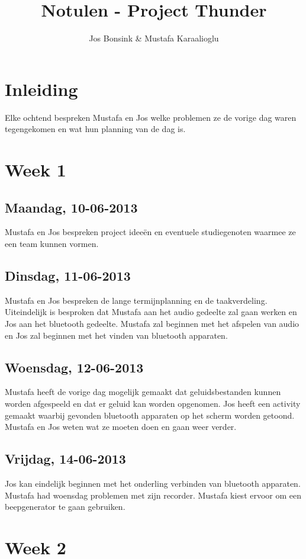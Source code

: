 \documentclass[12pt]{article}
\author{Jos Bonsink \& Mustafa Karaalioglu}
\begin{document}
\title{Notulen - Project Thunder}
\maketitle

\section*{Inleiding}
Elke ochtend bespreken Mustafa en Jos welke problemen ze de vorige dag waren tegengekomen en wat hun planning van de dag is.

\section*{Week 1}
\subsection*{Maandag, 10-06-2013}
Mustafa en Jos bespreken project idee\"en en eventuele studiegenoten waarmee ze een team kunnen vormen.
\subsection*{Dinsdag, 11-06-2013}
Mustafa en Jos bespreken de lange termijnplanning en de taakverdeling. Uiteindelijk is besproken dat Mustafa aan het audio gedeelte zal gaan werken en Jos aan het bluetooth gedeelte. Mustafa zal beginnen met het afspelen van audio en Jos zal beginnen met het vinden van bluetooth apparaten.
\subsection*{Woensdag, 12-06-2013}
Mustafa heeft de vorige dag mogelijk gemaakt dat geluidsbestanden kunnen worden afgespeeld en dat er geluid kan worden opgenomen. Jos heeft een activity gemaakt waarbij gevonden bluetooth apparaten op het scherm worden getoond. Mustafa en Jos weten wat ze moeten doen en gaan weer verder.
\subsection*{Vrijdag, 14-06-2013}
Jos kan eindelijk beginnen met het onderling verbinden van bluetooth apparaten. Mustafa had woensdag problemen met zijn recorder. Mustafa kiest ervoor om een beepgenerator te gaan gebruiken.


\section*{Week 2}
\end{document}

